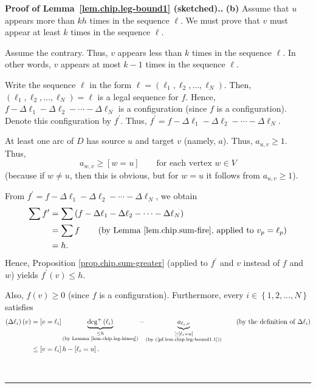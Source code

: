 \documentclass[numbers=enddot,12pt,final,onecolumn,notitlepage]{scrartcl}%
\theoremstyle{definition}
\newenvironment{proof}[1][Proof]{\noindent\textbf{#1.} }{\ \rule{0.5em}{0.5em}}
\let\sumnonlimits\sum
\renewcommand{\sum}{\sumnonlimits\limits}
\begin{document}
\begin{proof}[Proof of Lemma~\ref{lem.chip.leg-bound1} (sketched).]
\textbf{(b)} Assume that $u$ appears more than $kh$ times in the sequence
$\ell$. We must prove that $v$ must appear at least $k$ times in the sequence
$\ell$.

Assume the contrary. Thus, $v$ appears less than $k$ times in the sequence
$\ell$. In other words, $v$ appears at most $k-1$ times in the sequence $\ell$.

Write the sequence $\ell$ in the form $\ell=\left(  \ell_{1},\ell_{2}%
,\ldots,\ell_{N}\right)  $. Then, $\left(  \ell_{1},\ell_{2},\ldots,\ell
_{N}\right)  =\ell$ is a legal sequence for $f$. Hence, $f-\Delta\ell
_{1}-\Delta\ell_{2}-\cdots-\Delta\ell_{N}$ is a configuration (since $f$ is a
configuration). Denote this configuration by $f^{\prime}$. Thus, $f^{\prime
}=f-\Delta\ell_{1}-\Delta\ell_{2}-\cdots-\Delta\ell_{N}$.

At least one arc of $D$ has source $u$ and target $v$ (namely,
$a$). Thus, $a_{u,v}\geq1$. Thus,%
\begin{equation}
a_{w,v}\geq\left[  w=u\right]  \qquad\text{for each vertex }w\in V
\label{pf.lem.chip.leg-bound1.1}%
\end{equation}
(because if $w\neq u$, then this is obvious, but for $w=u$ it follows from
$a_{u,v}\geq1$).

From $f^{\prime}=f-\Delta\ell_{1}-\Delta\ell_{2}-\cdots-\Delta\ell_{N}$, we
obtain%
\begin{align*}
\sum f^{\prime}  &  =\sum\left(  f-\Delta\ell_{1}-\Delta\ell_{2}-\cdots
-\Delta\ell_{N}\right) \\
&  =\sum f\qquad\left(
\text{by Lemma~\ref{lem.chip.sum-fire}, applied to } v_p = \ell_p
\right) \\
&  =h.
\end{align*}
Hence, Proposition \ref{prop.chip.sum-greater} (applied to $f^{\prime}$ and
$v$ instead of $f$ and $w$) yields $f^{\prime}\left(  v\right)  \leq h$.

Also, $f\left(  v\right)  \geq0$ (since $f$ is a configuration). Furthermore,
every $i\in\left\{  1,2,\ldots,N\right\}  $ satisfies%
\begin{align}
\left(  \Delta\ell_{i}\right)  \left(  v\right)    & =\left[  v=\ell
_{i}\right]  \underbrace{\deg^{+}\left(  \ell_{i}\right)  }_{\substack{\leq
h\\\text{(by Lemma \ref{lem.chip.leg-hineq})}}}-\underbrace{a_{\ell_{i},v}%
}_{\substack{\geq\left[  \ell_{i}=u\right]  \\\text{(by
(\ref{pf.lem.chip.leg-bound1.1}))}}}\qquad \left(  \text{by the
definition of }\Delta\ell_{i}\right)  \nonumber\\
& \leq\left[  v=\ell_{i}\right]  h-\left[  \ell_{i}=u\right]
.\label{pf.lem.chip.leg-bound1.3}%
\end{align}



\end{proof}
\end{document}
